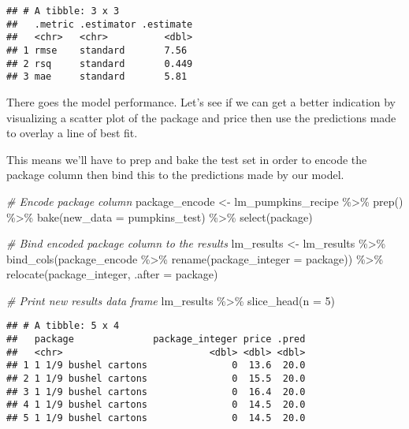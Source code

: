 \documentclass[
]{article}
\newenvironment{Shaded}{\begin{snugshade}}{\end{snugshade}}
\newcommand{\AttributeTok}[1]{\textcolor[rgb]{0.77,0.63,0.00}{#1}}
\newcommand{\CommentTok}[1]{\textcolor[rgb]{0.56,0.35,0.01}{\textit{#1}}}
\newcommand{\DecValTok}[1]{\textcolor[rgb]{0.00,0.00,0.81}{#1}}
\newcommand{\FunctionTok}[1]{\textcolor[rgb]{0.00,0.00,0.00}{#1}}
\newcommand{\NormalTok}[1]{#1}
\newcommand{\OtherTok}[1]{\textcolor[rgb]{0.56,0.35,0.01}{#1}}
\newcommand{\SpecialCharTok}[1]{\textcolor[rgb]{0.00,0.00,0.00}{#1}}
\begin{document}
\begin{verbatim}
## # A tibble: 3 x 3
##   .metric .estimator .estimate
##   <chr>   <chr>          <dbl>
## 1 rmse    standard       7.56 
## 2 rsq     standard       0.449
## 3 mae     standard       5.81
\end{verbatim}

There goes the model performance. Let's see if we can get a better
indication by visualizing a scatter plot of the package and price then
use the predictions made to overlay a line of best fit.

This means we'll have to prep and bake the test set in order to encode
the package column then bind this to the predictions made by our model.

\begin{Shaded}
\begin{Highlighting}[]
\CommentTok{\# Encode package column}
\NormalTok{package\_encode }\OtherTok{\textless{}{-}}\NormalTok{ lm\_pumpkins\_recipe }\SpecialCharTok{\%\textgreater{}\%} 
  \FunctionTok{prep}\NormalTok{() }\SpecialCharTok{\%\textgreater{}\%} 
  \FunctionTok{bake}\NormalTok{(}\AttributeTok{new\_data =}\NormalTok{ pumpkins\_test) }\SpecialCharTok{\%\textgreater{}\%} 
  \FunctionTok{select}\NormalTok{(package)}


\CommentTok{\# Bind encoded package column to the results}
\NormalTok{lm\_results }\OtherTok{\textless{}{-}}\NormalTok{ lm\_results }\SpecialCharTok{\%\textgreater{}\%} 
  \FunctionTok{bind\_cols}\NormalTok{(package\_encode }\SpecialCharTok{\%\textgreater{}\%} 
              \FunctionTok{rename}\NormalTok{(}\AttributeTok{package\_integer =}\NormalTok{ package)) }\SpecialCharTok{\%\textgreater{}\%} 
  \FunctionTok{relocate}\NormalTok{(package\_integer, }\AttributeTok{.after =}\NormalTok{ package)}


\CommentTok{\# Print new results data frame}
\NormalTok{lm\_results }\SpecialCharTok{\%\textgreater{}\%} 
  \FunctionTok{slice\_head}\NormalTok{(}\AttributeTok{n =} \DecValTok{5}\NormalTok{)}
\end{Highlighting}
\end{Shaded}

\begin{verbatim}
## # A tibble: 5 x 4
##   package              package_integer price .pred
##   <chr>                          <dbl> <dbl> <dbl>
## 1 1 1/9 bushel cartons               0  13.6  20.0
## 2 1 1/9 bushel cartons               0  15.5  20.0
## 3 1 1/9 bushel cartons               0  16.4  20.0
## 4 1 1/9 bushel cartons               0  14.5  20.0
## 5 1 1/9 bushel cartons               0  14.5  20.0
\end{verbatim}
\end{document}
